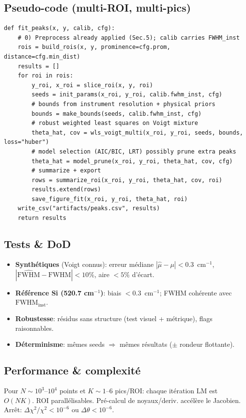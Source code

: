 \subsection{Pseudo-code (multi-ROI, multi-pics)}
\begin{lstlisting}[basicstyle=\ttfamily\small]
def fit_peaks(x, y, calib, cfg):
    # 0) Preprocess already applied (Sec.5); calib carries FWHM_inst
    rois = build_rois(x, y, prominence=cfg.prom, distance=cfg.min_dist)
    results = []
    for roi in rois:
        y_roi, x_roi = slice_roi(x, y, roi)
        seeds = init_params(x_roi, y_roi, calib.fwhm_inst, cfg)
        # bounds from instrument resolution + physical priors
        bounds = make_bounds(seeds, calib.fwhm_inst, cfg)
        # robust weighted least squares on Voigt mixture
        theta_hat, cov = wls_voigt_multi(x_roi, y_roi, seeds, bounds, loss="huber")
        # model selection (AIC/BIC, LRT) possibly prune extra peaks
        theta_hat = model_prune(x_roi, y_roi, theta_hat, cov, cfg)
        # summarize + export
        rows = summarize_roi(x_roi, y_roi, theta_hat, cov, roi)
        results.extend(rows)
        save_figure_fit(x_roi, y_roi, theta_hat, roi)
    write_csv("artifacts/peaks.csv", results)
    return results
\end{lstlisting}

\subsection{Tests \& DoD}
\begin{itemize}[nosep]
\item \textbf{Synthétiques} (Voigt connus): erreur médiane $|\hat{\mu}-\mu|<0.3$~cm$^{-1}$, $|\widehat{\mathrm{FWHM}}-\mathrm{FWHM}|<10\%$, aire $<5\%$ d'écart.
\item \textbf{Référence Si (520.7 cm$^{-1}$)}: biais $<0.3$~cm$^{-1}$; FWHM cohérente avec $\mathrm{FWHM}_{\text{inst}}$.
\item \textbf{Robustesse}: résidus sans structure (test visuel + métrique), flags raisonnables.
\item \textbf{Déterminisme}: mêmes seeds $\Rightarrow$ mêmes résultats ($\pm$ rondeur flottante).
\end{itemize}

\subsection{Performance \& complexité}
Pour $N\sim 10^3$--$10^4$ points et $K\sim 1$--$6$ pics/ROI: chaque itération LM est $O(NK)$. ROI parallélisables. Pré-calcul de noyaux/deriv. accélère le Jacobien. Arrêt: $\Delta\chi^2/\chi^2<10^{-6}$ ou $\Delta\theta<10^{-6}$.

